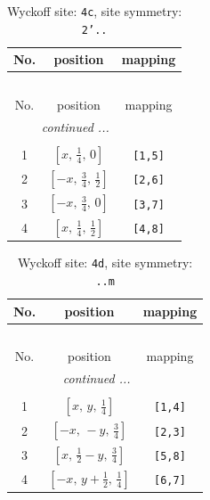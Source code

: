 \documentclass[fleqn,8pt]{jsarticle}
\begin{document}
\renewcommand{\arraystretch}{1.2}
\begin{longtable}{ccc}
\caption{Wyckoff site: {\tt 4c}, site symmetry: {\tt 2'..}}
 \\
 \hline \hline
No. & position & mapping \\ \hline \endfirsthead

\multicolumn{2}{l}{\tablename\ \thetable{}} \\
 \hline \hline
No. & position & mapping \\ \hline \endhead

 \hline \hline
\multicolumn{2}{r}{\footnotesize\it continued ...} \\ \endfoot

 \hline \hline
\multicolumn{2}{r}{} \\ \endlastfoot

1 & $\left[ x,\, \frac{1}{4},\, 0 \right]$ & {\tt [1,5]} \\ \hline
2 & $\left[ - x,\, \frac{3}{4},\, \frac{1}{2} \right]$ & {\tt [2,6]} \\ \hline
3 & $\left[ - x,\, \frac{3}{4},\, 0 \right]$ & {\tt [3,7]} \\ \hline
4 & $\left[ x,\, \frac{1}{4},\, \frac{1}{2} \right]$ & {\tt [4,8]} \\
\end{longtable}
\renewcommand{\arraystretch}{1.2}
\begin{longtable}{ccc}
\caption{Wyckoff site: {\tt 4d}, site symmetry: {\tt ..m}}
 \\
 \hline \hline
No. & position & mapping \\ \hline \endfirsthead

\multicolumn{2}{l}{\tablename\ \thetable{}} \\
 \hline \hline
No. & position & mapping \\ \hline \endhead

 \hline \hline
\multicolumn{2}{r}{\footnotesize\it continued ...} \\ \endfoot

 \hline \hline
\multicolumn{2}{r}{} \\ \endlastfoot

1 & $\left[ x,\, y,\, \frac{1}{4} \right]$ & {\tt [1,4]} \\ \hline
2 & $\left[ - x,\, - y,\, \frac{3}{4} \right]$ & {\tt [2,3]} \\ \hline
3 & $\left[ x,\, \frac{1}{2} - y,\, \frac{3}{4} \right]$ & {\tt [5,8]} \\ \hline
4 & $\left[ - x,\, y + \frac{1}{2},\, \frac{1}{4} \right]$ & {\tt [6,7]} \\
\end{longtable}
\end{document}
